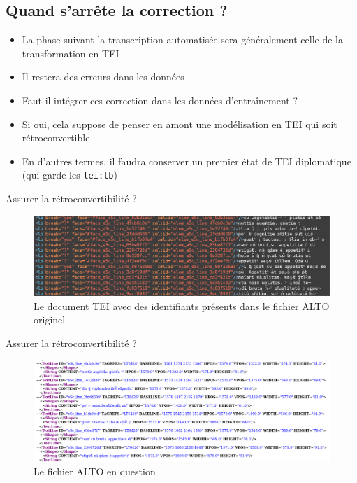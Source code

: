 \documentclass[11pt,aspectratio=169]{beamer}
\begin{document}
\subsection{Quand s'arrête la correction ?}
\begin{frame}
\begin{center}
\begin{itemize}
\item La phase suivant la transcription automatisée sera généralement celle de la transformation en TEI
\item Il restera des erreurs dans les données
\item Faut-il intégrer ces correction dans les données d'entraînement ? 
\item Si oui, cela suppose de penser en amont une modélisation en TEI qui soit rétroconvertible
\item En d'autres termes, il faudra conserver un premier état de TEI diplomatique (qui garde les \texttt{tei:lb})
\end{itemize}
\end{center}
\end{frame}


\begin{frame}{Assurer la rétroconvertibilité ?}
\begin{center}
\begin{figure}
\includegraphics[width=1\textwidth]{img/tei_retroconvertible.png}
\caption{Le document TEI avec des identifiants présents dans le fichier ALTO originel}
\end{figure}
\end{center}
\end{frame}


\begin{frame}{Assurer la rétroconvertibilité ?}
\begin{center}
\begin{figure}
\includegraphics[width=1\textwidth]{img/alto.png}
\caption{Le fichier ALTO en question}
\end{figure}
\end{center}
\end{frame}
\end{document}

